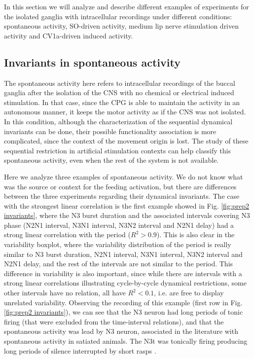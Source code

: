 
In this section we will analyze and describe different examples of experiments for the isolated ganglia with intracellular recordings under different conditions: spontaneous activity, SO-driven activity, medium lip nerve stimulation driven activity and CV1a-driven induced activity.

\subsection{Invariants in spontaneous activity}
The spontaneous activity here refers to intracellular recordings of the buccal ganglia after the isolation of the CNS with no chemical or electrical induced stimulation. In that case, since the CPG is able to maintain the activity in an autonomous manner, it keeps the motor activity as if the CNS was not isolated. In this condition, although the characterization of the sequential dynamical invariants can be done, their possible functionality association is more complicated, since the context of the movement origin is lost. The study of these sequential restriction in artificial stimulation contexts can help classify this spontaneous activity, even when the rest of the system is not available. 

Here we analyze three examples of spontaneous activity. We do not know what was the source or context for the feeding activation, but there are differences between the three experiments regarding their dynamical invariants. The case with the strongest linear correlation is the first example showed in Fig. \ref{fig:prep2 invariants}, where the N3 burst duration and the associated intervals covering N3 phase (N2N1 interval, N3N1 interval, N3N2 interval and N2N1 delay) had a strong linear correlation with the period ($R^2 > 0.9$). This is also clear in the variability boxplot, where the variability distribution of the period is really similar to N3 burst duration, N2N1 interval, N3N1 interval, N3N2 interval and N2N1 delay, and the rest of the intervals are not similar to the period. This difference in variability is also important, since while there are intervals with a strong linear correlations illustrating cycle-by-cycle dynamical restrictions, some other intervals have no relation, all have $R^2 < 0.1$, i.e. are free to display unrelated variability. Observing the recording of this example (first row in Fig. \ref{fig:prep2 invariants}), we can see that the N3 neuron had long periods of tonic firing (that were excluded from the time-interval relations), and that the spontaneous activity was lead by N3 neuron, associated in the literature with spontaneous activity in satiated animals. The N3t was tonically firing producing long periods of silence interrupted by short rasps \parencite{staras_loss_2003,benjamin_distributed_2012}.

